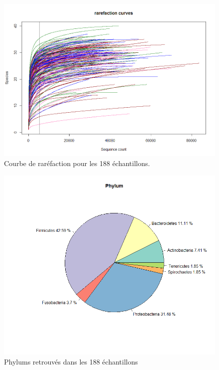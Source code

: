 \documentclass[12pt,a4paper]{article}
\begin{document}
\begin{figure}[!h]
\begin{center}
\includegraphics[scale=0.5]{img/rarefaction.png}\hfill
\end{center}
\caption{Courbe de raréfaction pour les 188 échantillons. }
\label{rarefaction}
\end{figure}


\begin{figure}[!ht]
\begin{center}
\includegraphics[scale=0.5]{img/phylum.png}\hfill
\end{center}
\caption{Phylums retrouvés dans les 188 échantillons}
\label{phylum}
\end{figure}
\end{document}
